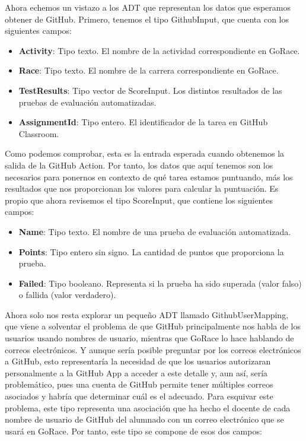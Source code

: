 Ahora echemos un vistazo a los \acrshort{ADT} que representan los datos que esperamos obtener de GitHub. Primero, tenemos el tipo GithubInput, que cuenta con los siguientes campos:
\begin{itemize}
    \item \textbf{Activity}: Tipo texto. El nombre de la actividad correspondiente en GoRace.
	\item \textbf{Race}: Tipo texto. El nombre de la carrera correspondiente en GoRace.
	\item \textbf{TestResults}: Tipo vector de ScoreInput. Los distintos resultados de las pruebas de evaluación automatizadas.
	\item \textbf{AssignmentId}: Tipo entero. El identificador de la tarea en GitHub Classroom.
\end{itemize}
Como podemos comprobar, esta es la entrada esperada cuando obtenemos la salida de la GitHub Action. Por tanto, los datos que aquí tenemos son los necesarios para ponernos en contexto de qué tarea estamos puntuando, más los resultados que nos proporcionan los valores para calcular la puntuación. Es propio que ahora revisemos el tipo ScoreInput, que contiene los siguientes campos:
\begin{itemize}
    \item \textbf{Name}: Tipo texto. El nombre de una prueba de evaluación automatizada.
	\item \textbf{Points}: Tipo entero sin signo. La cantidad de puntos que proporciona la prueba.
	\item \textbf{Failed}: Tipo booleano. Representa si la prueba ha sido superada (valor falso) o fallida (valor verdadero).
\end{itemize}

Ahora solo nos resta explorar un pequeño \acrshort{ADT} llamado GithubUserMapping, que viene a solventar el problema de que GitHub principalmente nos habla de los usuarios usando nombres de usuario, mientras que GoRace lo hace hablando de correos electrónicos. Y aunque sería posible preguntar por los correos electrónicos a GitHub, esto representaría la necesidad de que los usuarios autorizaran personalmente a la GitHub App a acceder a este detalle y, aun así, sería problemático, pues una cuenta de GitHub permite tener múltiples correos asociados\cite{githubRESTEmail} y habría que determinar cuál es el adecuado. Para esquivar este problema, este tipo representa una asociación que ha hecho el docente de cada nombre de usuario de GitHub del alumnado con un correo electrónico que se usará en GoRace. Por tanto, este tipo se compone de esos dos campos:

